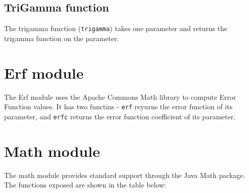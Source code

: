 \subsection{TriGamma function}
The trigamma function (\Verb+trigamma+) takes one parameter and returns the trigamma function on the parameter.
\section{Erf module}
The Erf module uses the Apache Commons Math library to compute Error Function values. It has two functins - \Verb+erf+ reyurns the error function of its parameter, and \verb+erfc+ returns the error function coefficient of its parameter.
\section{Math module}
The math module provides standard support through the Java Math package. The functions exposed are shown in the table below:
